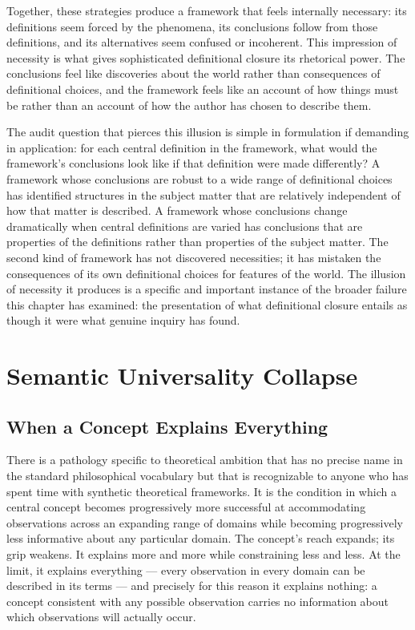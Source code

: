 \documentclass[12pt, openright, twoside]{book}
\begin{document}
Together, these strategies produce a framework that feels
internally necessary: its definitions seem forced by the
phenomena, its conclusions follow from those definitions,
and its alternatives seem confused or incoherent. This
impression of necessity is what gives sophisticated
definitional closure its rhetorical power. The conclusions
feel like discoveries about the world rather than consequences
of definitional choices, and the framework feels like an
account of how things must be rather than an account of
how the author has chosen to describe them.

The audit question that pierces this illusion is simple
in formulation if demanding in application: for each
central definition in the framework, what would the
framework's conclusions look like if that definition
were made differently? A framework whose conclusions
are robust to a wide range of definitional choices has
identified structures in the subject matter that are
relatively independent of how that matter is described.
A framework whose conclusions change dramatically when
central definitions are varied has conclusions that
are properties of the definitions rather than properties
of the subject matter. The second kind of framework
has not discovered necessities; it has mistaken the
consequences of its own definitional choices for
features of the world. The illusion of necessity it
produces is a specific and important instance of the
broader failure this chapter has examined: the
presentation of what definitional closure entails
as though it were what genuine inquiry has found.

\clearpage

\chapter{Semantic Universality Collapse}

\section{When a Concept Explains Everything}

There is a pathology specific to theoretical ambition that has
no precise name in the standard philosophical vocabulary but
that is recognizable to anyone who has spent time with synthetic
theoretical frameworks. It is the condition in which a central
concept becomes progressively more successful at accommodating
observations across an expanding range of domains while becoming
progressively less informative about any particular domain.
The concept's reach expands; its grip weakens. It explains more
and more while constraining less and less. At the limit, it
explains everything --- every observation in every domain can
be described in its terms --- and precisely for this reason
it explains nothing: a concept consistent with any possible
observation carries no information about which observations
will actually occur.
\end{document}

